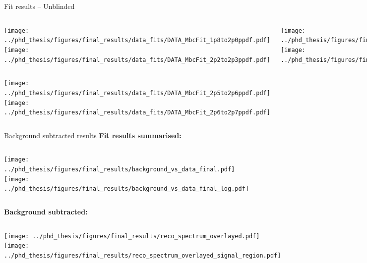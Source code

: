 \documentclass[xcolor=dvipsnames]{beamer}
\begin{document}
\begin{frame}{Fit results -- Unblinded}
\begin{columns}
   \centering
   \texttt{[image: ../phd\_thesis/figures/final\_results/data\_fits/DATA\_MbcFit\_1p8to2p0ppdf.pdf]}
   \texttt{[image: ../phd\_thesis/figures/final\_results/data\_fits/DATA\_MbcFit\_2p2to2p3ppdf.pdf]}

   \centering
   \texttt{[image: ../phd\_thesis/figures/final\_results/data\_fits/DATA\_MbcFit\_2p0to2p1ppdf.pdf]}
   \texttt{[image: ../phd\_thesis/figures/final\_results/data\_fits/DATA\_MbcFit\_2p3to2p4ppdf.pdf]}

   \centering
   \texttt{[image: ../phd\_thesis/figures/final\_results/data\_fits/DATA\_MbcFit\_2p1to2p2ppdf.pdf]}
   \texttt{[image: ../phd\_thesis/figures/final\_results/data\_fits/DATA\_MbcFit\_2p4to2p5ppdf.pdf]}
\end{columns}
\begin{columns}
   \centering
   \texttt{[image: ../phd\_thesis/figures/final\_results/data\_fits/DATA\_MbcFit\_2p5to2p6ppdf.pdf]}
   \centering
   \texttt{[image: ../phd\_thesis/figures/final\_results/data\_fits/DATA\_MbcFit\_2p6to2p7ppdf.pdf]}

\end{columns}
\end{frame}

\begin{frame}{Background subtracted results}
   \centering\scriptsize
\textbf{Fit results summarised:}
\begin{columns}
   \centering
   \texttt{[image: ../phd\_thesis/figures/final\_results/background\_vs\_data\_final.pdf]}
   \centering
   \texttt{[image: ../phd\_thesis/figures/final\_results/background\_vs\_data\_final\_log.pdf]}
\end{columns}
\textbf{Background subtracted:}

\begin{columns}
   \centering
   \texttt{[image: ../phd\_thesis/figures/final\_results/reco\_spectrum\_overlayed.pdf]}
   \centering
   \texttt{[image: ../phd\_thesis/figures/final\_results/reco\_spectrum\_overlayed\_signal\_region.pdf]}
\end{columns}

\end{frame}
\end{document}
